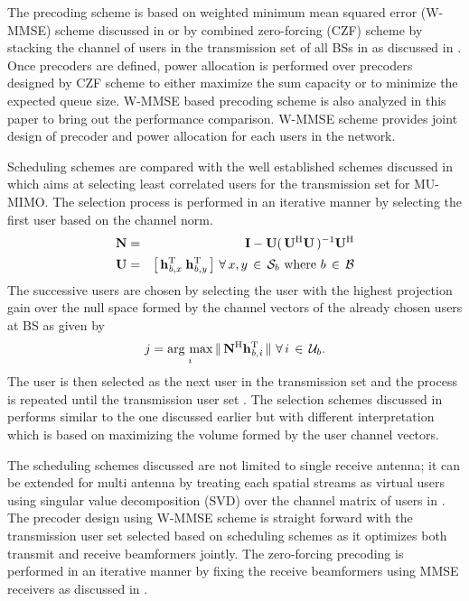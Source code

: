 The precoding scheme is based on weighted minimum mean squared error (W-MMSE) scheme discussed in \cite{wmmse_shi} or by combined zero-forcing (CZF) scheme by stacking the channel of users in the transmission set of all BSs in  as discussed in \cite{spencer2004zero}. Once precoders are defined, power allocation is performed over precoders designed by CZF scheme to either maximize the sum capacity or to minimize the expected queue size. W-MMSE based precoding scheme is also analyzed in this paper to bring out the performance comparison. W-MMSE scheme provides joint design of precoder and power allocation for each users in the network.

Scheduling schemes are compared with the well established schemes discussed in \cite{sus2006zfbf,zhang2007user} which aims at selecting least correlated users for the transmission set for MU-MIMO. The selection process is performed in an iterative manner by selecting the first user based on the channel norm.
\begin{eqnarray}
\mathbf{N} &=& \mathbf{I} - \mathbf{U} ( \, \mathbf{U}^{\mathrm{H}} \mathbf{U} \, )^{-1} \mathbf{U}^{\mathrm{H}} \label{sm-e3} \\
\mathbf{U} &=& \left [ \, \mathbf{h}_{\mathit{b},\mathit{x}}^{\mathrm{T}} \; \mathbf{h}_{\mathit{b},\mathit{y}}^{\mathrm{T}} \, \right ] \, \forall \, x,y \, \in \, \mathcal{S}_b \text{ where } b \, \in \, \mathcal{B} \nonumber
\end{eqnarray}
The successive users are chosen by selecting the user with the highest projection gain over the null space formed by the channel vectors of the already chosen users at BS  as given by
\begin{equation}
j = \operatorname*{\arg\,max}_i \|\, \mathbf{N}^{\mathrm{H}} \mathbf{h}_{\mathit{b},\mathit{i}}^{\mathrm{T}} \,\| \, \, \forall \, i \, \in \, \mathcal{U}_b.
\end{equation}
The user  is then selected as the next user in the transmission set and the process is repeated until the transmission user set . The selection schemes discussed in \cite{jin2010novel,ko2012determinant} performs similar to the one discussed earlier but with different interpretation which is based on maximizing the volume formed by the user channel vectors.

The scheduling schemes discussed are not limited to single receive antenna; it can be extended for multi antenna by treating each spatial streams as virtual users using singular value decomposition (SVD) over the channel matrix of users in . The precoder design using W-MMSE scheme is straight forward with the transmission user set selected based on scheduling schemes as it optimizes both transmit and receive beamformers jointly. The zero-forcing precoding is performed in an iterative manner by fixing the receive beamformers using MMSE receivers as discussed in \cite{antti_user_selection}.
